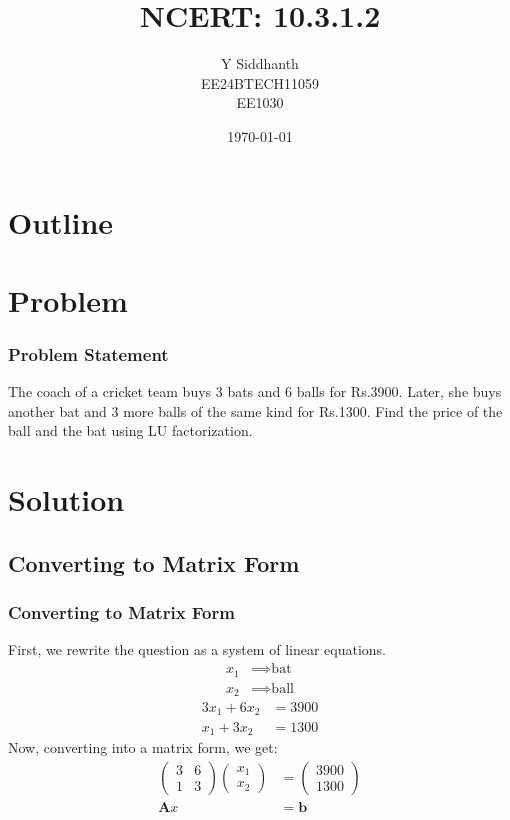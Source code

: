 \documentclass{beamer}
\title{NCERT: 10.3.1.2}
\author{Y Siddhanth \\ EE24BTECH11059\\ EE1030}
\date{\today}
\theoremstyle{remark}
\newcommand{\myvec}[1]{\ensuremath{\begin{pmatrix}#1\end{pmatrix}}}
\let\vec\mathbf
\numberwithin{equation}{section}
\begin{document}
\begin{frame}
\titlepage
\end{frame}

\section*{Outline}
\begin{frame}
\tableofcontents
\end{frame}
\section{Problem}
\begin{frame}
\frametitle{Problem Statement}
The coach of a cricket team buys 3 bats and 6 balls for Rs.3900. Later, she buys another bat and 3 more balls of the same kind for Rs.1300. Find the price of the ball and the bat using LU factorization. \\
\end{frame}

\section{Solution}
\subsection{Converting to Matrix Form}
\begin{frame}
	\frametitle{Converting to Matrix Form}
	First, we rewrite the question as a system of linear equations.
	\begin{align}
		x_1 &\implies \text{bat} \\
		x_2 &\implies \text{ball}
	\end{align}
	\begin{align}
		3x_1 + 6x_2 &= 3900 \\
		x_1 + 3x_2 &= 1300 
	\end{align}
	Now, converting into a matrix form, we get:
	\begin{align}
		\myvec{3&6\\1&3}\myvec{x_1 \\ x_2} &= \myvec{3900 \\ 1300} \\ 
		\vec{A}x &= \vec{b}
	\end{align}
\end{frame}
\end{document}
